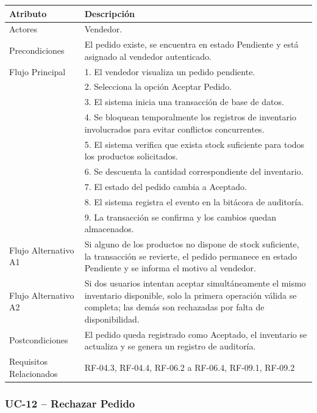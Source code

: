 \documentclass[12pt,a4paper]{report}
\begin{document}
\begin{longtable}{|p{4cm}|p{10cm}|}
\hline
\textbf{Atributo} & \textbf{Descripción} \\ \hline
Actores & Vendedor. \\ \hline
Precondiciones & El pedido existe, se encuentra en estado Pendiente y está asignado al vendedor autenticado. \\ \hline
Flujo Principal &
1. El vendedor visualiza un pedido pendiente.\\
& 2. Selecciona la opción Aceptar Pedido.\\
& 3. El sistema inicia una transacción de base de datos.\\
& 4. Se bloquean temporalmente los registros de inventario involucrados para evitar conflictos concurrentes.\\
& 5. El sistema verifica que exista stock suficiente para todos los productos solicitados.\\
& 6. Se descuenta la cantidad correspondiente del inventario.\\
& 7. El estado del pedido cambia a Aceptado.\\
& 8. El sistema registra el evento en la bitácora de auditoría.\\
& 9. La transacción se confirma y los cambios quedan almacenados. \\ \hline
Flujo Alternativo A1 & Si alguno de los productos no dispone de stock suficiente, la transacción se revierte, el pedido permanece en estado Pendiente y se informa el motivo al vendedor. \\ \hline
Flujo Alternativo A2 & Si dos usuarios intentan aceptar simultáneamente el mismo inventario disponible, solo la primera operación válida se completa; las demás son rechazadas por falta de disponibilidad. \\ \hline
Postcondiciones & El pedido queda registrado como Aceptado, el inventario se actualiza y se genera un registro de auditoría. \\ \hline
Requisitos Relacionados & RF-04.3, RF-04.4, RF-06.2 a RF-06.4, RF-09.1, RF-09.2 \\ \hline
\end{longtable}


\subsubsection{UC-12 -- Rechazar Pedido}
\end{document}

